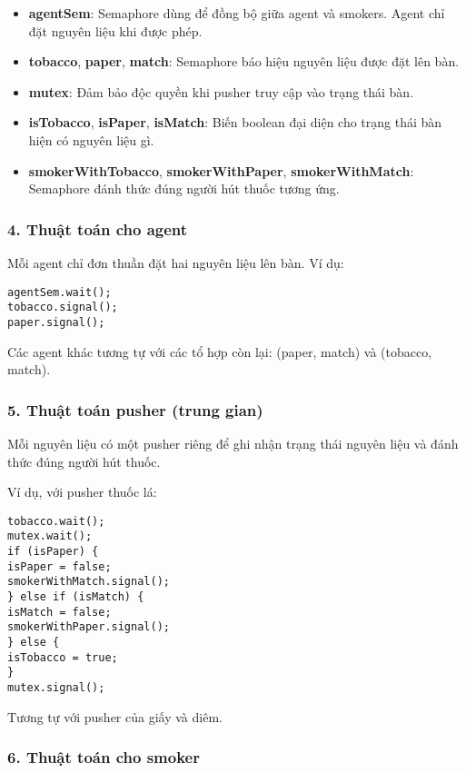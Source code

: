\begin{itemize}
\item \textbf{agentSem}: Semaphore dùng để đồng bộ giữa agent và smokers. Agent chỉ đặt nguyên liệu khi được phép.
\item \textbf{tobacco}, \textbf{paper}, \textbf{match}: Semaphore báo hiệu nguyên liệu được đặt lên bàn.
\item \textbf{mutex}: Đảm bảo độc quyền khi pusher truy cập vào trạng thái bàn.
\item \textbf{isTobacco}, \textbf{isPaper}, \textbf{isMatch}: Biến boolean đại diện cho trạng thái bàn hiện có nguyên liệu gì.
\item \textbf{smokerWithTobacco}, \textbf{smokerWithPaper}, \textbf{smokerWithMatch}: Semaphore đánh thức đúng người hút thuốc tương ứng.
\end{itemize}

\subsubsection*{4. Thuật toán cho agent}

Mỗi agent chỉ đơn thuần đặt hai nguyên liệu lên bàn. Ví dụ:

\begin{lstlisting}
agentSem.wait();
tobacco.signal();
paper.signal();
\end{lstlisting}

Các agent khác tương tự với các tổ hợp còn lại: (paper, match) và (tobacco, match).

\subsubsection*{5. Thuật toán pusher (trung gian)}

Mỗi nguyên liệu có một pusher riêng để ghi nhận trạng thái nguyên liệu và đánh thức đúng người hút thuốc.

Ví dụ, với pusher thuốc lá:
\begin{lstlisting}
tobacco.wait();
mutex.wait();
if (isPaper) {
isPaper = false;
smokerWithMatch.signal();
} else if (isMatch) {
isMatch = false;
smokerWithPaper.signal();
} else {
isTobacco = true;
}
mutex.signal();
\end{lstlisting}

Tương tự với pusher của giấy và diêm.

\subsubsection*{6. Thuật toán cho smoker}

